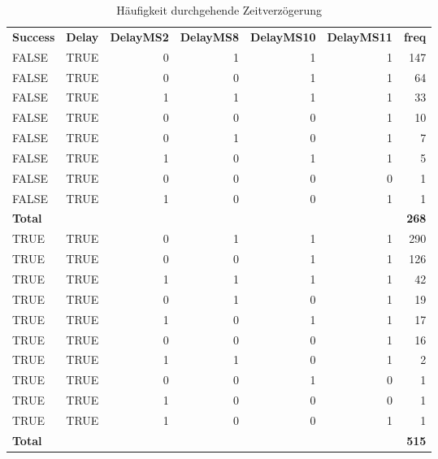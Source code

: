 \begin{table}[H]
	\centering
	\caption{Häufigkeit durchgehende Zeitverzögerung}
	\begin{tabular}{lrrrrrr}
		\textbf{Success} & \multicolumn{1}{l}{\textbf{Delay}} & \multicolumn{1}{l}{\textbf{DelayMS2}} & \multicolumn{1}{l}{\textbf{DelayMS8}} & \multicolumn{1}{l}{\textbf{DelayMS10}} & \multicolumn{1}{l}{\textbf{DelayMS11}} & \multicolumn{1}{l}{\textbf{freq}} \\
		FALSE & \multicolumn{1}{l}{TRUE} & 0     & 1     & 1     & 1     & 147 \\
		FALSE & \multicolumn{1}{l}{TRUE} & 0     & 0     & 1     & 1     & 64 \\
		FALSE & \multicolumn{1}{l}{TRUE} & 1     & 1     & 1     & 1     & 33 \\
		FALSE & \multicolumn{1}{l}{TRUE} & 0     & 0     & 0     & 1     & 10 \\
		FALSE & \multicolumn{1}{l}{TRUE} & 0     & 1     & 0     & 1     & 7 \\
		FALSE & \multicolumn{1}{l}{TRUE} & 1     & 0     & 1     & 1     & 5 \\
		FALSE & \multicolumn{1}{l}{TRUE} & 0     & 0     & 0     & 0     & 1 \\
		FALSE & \multicolumn{1}{l}{TRUE} & 1     & 0     & 0     & 1     & 1 \\\hline
		\textbf{Total} &       &       &       &       &       & \textbf{268} \\
		TRUE  & \multicolumn{1}{l}{TRUE} & 0     & 1     & 1     & 1     & 290 \\
		TRUE  & \multicolumn{1}{l}{TRUE} & 0     & 0     & 1     & 1     & 126 \\
		TRUE  & \multicolumn{1}{l}{TRUE} & 1     & 1     & 1     & 1     & 42 \\
		TRUE  & \multicolumn{1}{l}{TRUE} & 0     & 1     & 0     & 1     & 19 \\
		TRUE  & \multicolumn{1}{l}{TRUE} & 1     & 0     & 1     & 1     & 17 \\
		TRUE  & \multicolumn{1}{l}{TRUE} & 0     & 0     & 0     & 1     & 16 \\
		TRUE  & \multicolumn{1}{l}{TRUE} & 1     & 1     & 0     & 1     & 2 \\
		TRUE  & \multicolumn{1}{l}{TRUE} & 0     & 0     & 1     & 0     & 1 \\
		TRUE  & \multicolumn{1}{l}{TRUE} & 1     & 0     & 0     & 0     & 1 \\
		TRUE  & \multicolumn{1}{l}{TRUE} & 1     & 0     & 0     & 1     & 1 \\\hline
		\textbf{Total} &       &       &       &       &       & \textbf{515} \\
	\end{tabular}%
	\label{fdleay}%
\end{table}%
